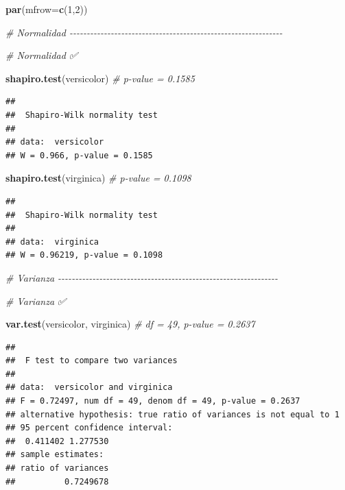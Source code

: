 \documentclass[
]{article}
\newenvironment{Shaded}{\begin{snugshade}}{\end{snugshade}}
\newcommand{\AttributeTok}[1]{\textcolor[rgb]{0.13,0.29,0.53}{#1}}
\newcommand{\CommentTok}[1]{\textcolor[rgb]{0.56,0.35,0.01}{\textit{#1}}}
\newcommand{\DecValTok}[1]{\textcolor[rgb]{0.00,0.00,0.81}{#1}}
\newcommand{\FunctionTok}[1]{\textcolor[rgb]{0.13,0.29,0.53}{\textbf{#1}}}
\newcommand{\NormalTok}[1]{#1}
\begin{document}
\begin{Shaded}
\begin{Highlighting}[]
\FunctionTok{par}\NormalTok{(}\AttributeTok{mfrow=}\FunctionTok{c}\NormalTok{(}\DecValTok{1}\NormalTok{,}\DecValTok{2}\NormalTok{))}

\CommentTok{\# Normalidad {-}{-}{-}{-}{-}{-}{-}{-}{-}{-}{-}{-}{-}{-}{-}{-}{-}{-}{-}{-}{-}{-}{-}{-}{-}{-}{-}{-}{-}{-}{-}{-}{-}{-}{-}{-}{-}{-}{-}{-}{-}{-}{-}{-}{-}{-}{-}{-}{-}{-}{-}{-}{-}{-}{-}{-}{-}{-}{-}{-}{-}{-}}

\CommentTok{\# Normalidad ✅}

\FunctionTok{shapiro.test}\NormalTok{(versicolor) }\CommentTok{\# p{-}value = 0.1585}
\end{Highlighting}
\end{Shaded}

\begin{verbatim}
## 
##  Shapiro-Wilk normality test
## 
## data:  versicolor
## W = 0.966, p-value = 0.1585
\end{verbatim}

\begin{Shaded}
\begin{Highlighting}[]
\FunctionTok{shapiro.test}\NormalTok{(virginica) }\CommentTok{\#  p{-}value = 0.1098}
\end{Highlighting}
\end{Shaded}

\begin{verbatim}
## 
##  Shapiro-Wilk normality test
## 
## data:  virginica
## W = 0.96219, p-value = 0.1098
\end{verbatim}

\begin{Shaded}
\begin{Highlighting}[]
\CommentTok{\# Varianza {-}{-}{-}{-}{-}{-}{-}{-}{-}{-}{-}{-}{-}{-}{-}{-}{-}{-}{-}{-}{-}{-}{-}{-}{-}{-}{-}{-}{-}{-}{-}{-}{-}{-}{-}{-}{-}{-}{-}{-}{-}{-}{-}{-}{-}{-}{-}{-}{-}{-}{-}{-}{-}{-}{-}{-}{-}{-}{-}{-}{-}{-}{-}{-}}

\CommentTok{\# Varianza ✅}

\FunctionTok{var.test}\NormalTok{(versicolor, virginica) }\CommentTok{\# df = 49, p{-}value = 0.2637}
\end{Highlighting}
\end{Shaded}

\begin{verbatim}
## 
##  F test to compare two variances
## 
## data:  versicolor and virginica
## F = 0.72497, num df = 49, denom df = 49, p-value = 0.2637
## alternative hypothesis: true ratio of variances is not equal to 1
## 95 percent confidence interval:
##  0.411402 1.277530
## sample estimates:
## ratio of variances 
##          0.7249678
\end{verbatim}
\end{document}
